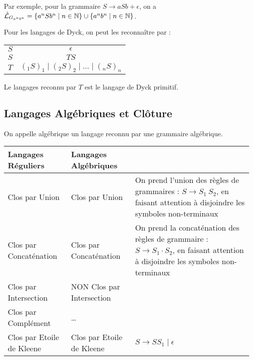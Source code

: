 \documentclass{cours}
\begin{document}
Par exemple, pour la grammaire $S \rightarrow aSb + \epsilon$, on a $\hat{\mathcal{L}}_{G_{a^{n}b^{n}}} = \left\{a^{n}Sb^{n}\mid n \in \mathbb{N} \right\} \cup \left\{a^{n}b^{n} \mid n \in \mathbb{N} \right\}$.

Pour les langages de Dyck, on peut les reconnaître par : 
\begin{center}
    \begin{tabular}{c@{$\rightarrow$}c}
        $S$ & $\epsilon$ \\
        $S$ & $T S$\\
        $T$ & $(_{1} S )_{1} \mid (_{2} S )_{2} \mid \ldots \mid (_{n} S )_{n}$
    \end{tabular}
\end{center}

\begin{remark}
    Le langages reconnu par $T$ est le langage de Dyck primitif. 
\end{remark}

\subsection{Langages Algébriques et Clôture}
\begin{proposition}
    On appelle algébrique un langage reconnu par une grammaire algébrique.
    \begin{center}
        \begin{tabular}{llp{6cm}}
            \toprule
            Langages Réguliers & Langages Algébriques & \\
            \midrule
            Clos par Union & Clos par Union & On prend l'union des règles de grammaires : $S \rightarrow S_{1}\ S_{2}$, en faisant attention à disjoindre les symboles non-terminaux\\
            Clos par Concaténation & Clos par Concaténation & On prend la concaténation des règles de grammaire : $S \rightarrow S_{1} \cdot S_{2}$, en faisant attention à disjoindre les symboles non-terminaux\\
            Clos par Intersection & NON Clos par Intersection & \\
            Clos par Complément & \dots &\\
            Clos par Etoile de Kleene & Clos par Etoile de Kleene & $S \rightarrow S S_{1} \mid \epsilon$\\
            \bottomrule         
        \end{tabular}
    \end{center}
\end{proposition}
\end{document}

